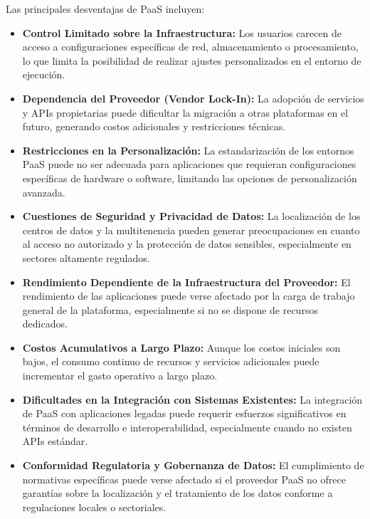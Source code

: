 {                Las principales desventajas de PaaS incluyen:
                
                \begin{itemize}
                    \item \textbf{Control Limitado sobre la Infraestructura:} Los usuarios carecen de acceso a configuraciones específicas de red, almacenamiento o procesamiento, lo que limita la posibilidad de realizar ajustes personalizados en el entorno de ejecución.
                    \item \textbf{Dependencia del Proveedor (Vendor Lock-In):} La adopción de servicios y APIs propietarias puede dificultar la migración a otras plataformas en el futuro, generando costos adicionales y restricciones técnicas.
                    \item \textbf{Restricciones en la Personalización:} La estandarización de los entornos PaaS puede no ser adecuada para aplicaciones que requieran configuraciones específicas de hardware o software, limitando las opciones de personalización avanzada.
                    \item \textbf{Cuestiones de Seguridad y Privacidad de Datos:} La localización de los centros de datos y la multitenencia pueden generar preocupaciones en cuanto al acceso no autorizado y la protección de datos sensibles, especialmente en sectores altamente regulados.
                    \item \textbf{Rendimiento Dependiente de la Infraestructura del Proveedor:} El rendimiento de las aplicaciones puede verse afectado por la carga de trabajo general de la plataforma, especialmente si no se dispone de recursos dedicados.
                    \item \textbf{Costos Acumulativos a Largo Plazo:} Aunque los costos iniciales son bajos, el consumo continuo de recursos y servicios adicionales puede incrementar el gasto operativo a largo plazo.
                    \item \textbf{Dificultades en la Integración con Sistemas Existentes:} La integración de PaaS con aplicaciones legadas puede requerir esfuerzos significativos en términos de desarrollo e interoperabilidad, especialmente cuando no existen APIs estándar.
                    \item \textbf{Conformidad Regulatoria y Gobernanza de Datos:} El cumplimiento de normativas específicas puede verse afectado si el proveedor PaaS no ofrece garantías sobre la localización y el tratamiento de los datos conforme a regulaciones locales o sectoriales.
                \end{itemize}
            
}
